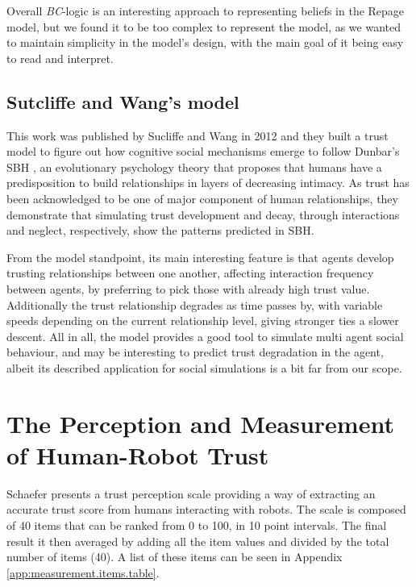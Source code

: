 Overall \textit{BC}-logic is an interesting approach to representing beliefs in the Repage model, but we found it to be too complex to represent the model, as we wanted to maintain simplicity in the model's design, with the main goal of it being easy to read and interpret.

\subsection{Sutcliffe and Wang's model}
\label{subsec:Related work:Sutcliffe and Wang}
This work was published by Sucliffe and Wang in 2012 \cite{Sutcliffe2012} and they built a trust model to figure out how cognitive social mechanisms emerge to follow Dunbar's \ac{SBH} \cite{Dunbar1998}, an evolutionary psychology theory that proposes that humans have a predisposition to build relationships in layers of decreasing intimacy. As trust has been acknowledged to be one of major component of human relationships, they demonstrate that simulating trust development and decay, through interactions and neglect, respectively, show the patterns predicted in \ac{SBH}.

From the model standpoint, its main interesting feature is that agents develop trusting relationships between one another, affecting interaction frequency between agents, by preferring to pick those with already high trust value. Additionally the trust relationship degrades as time passes by, with variable speeds depending on the current relationship level, giving stronger ties a slower descent. All in all, the model provides a good tool to simulate multi agent social behaviour, and may be interesting to predict trust degradation in the agent, albeit its described application for social simulations is a bit far from our scope.


\section{The Perception and Measurement of Human-Robot Trust}
\label{sec:Related work:The Perception and Measurement of Human-Robot Trust}

Schaefer \cite{Schaefer2009} presents a trust perception scale providing a way of extracting an accurate trust score from humans interacting with robots. The scale is composed of 40 items that can be ranked from 0 to 100, in 10 point intervals. The final result it then averaged by adding all the item values and divided by the total number of items (40). A list of these items can be seen in Appendix \ref{app:measurement.items.table}.

